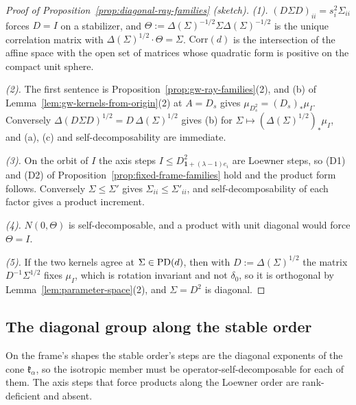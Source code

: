 \begin{proof}[Proof of Proposition~\ref{prop:diagonal-ray-families} (sketch)]
\emph{(1).} $(D\Sigma D)_{ii} = s_i^2\Sigma_{ii}$ forces $D = I$ on a stabilizer, and
$\Theta := \Delta(\Sigma)^{-1/2}\Sigma\Delta(\Sigma)^{-1/2}$ is the unique correlation matrix with
$\Delta(\Sigma)^{1/2}\cdot \Theta = \Sigma$. $\mathrm{Corr}(d)$ is the intersection of the affine space with the
open set of matrices whose quadratic form is positive on the compact unit sphere.

\emph{(2).} The first sentence is Proposition~\ref{prop:gw-ray-families}(2), and (b) of
Lemma~\ref{lem:gw-kernels-from-origin}(2) at $A = D_s$ gives $\mu_{D_s^2} = (D_s)_*\mu_I$. Conversely
$\Delta(D\Sigma D)^{1/2} = D\,\Delta(\Sigma)^{1/2}$ gives (b) for $\Sigma \mapsto (\Delta(\Sigma)^{1/2})_*\mu_I$,
and (a), (c) and self-decomposability are immediate.

\emph{(3).} On the orbit of $I$ the axis steps $I \le D^2_{\mathbf 1 + (\lambda-1)e_i}$ are Loewner steps,
so (D1) and (D2) of Proposition~\ref{prop:fixed-frame-families} hold and the product form follows.
Conversely $\Sigma \le \Sigma'$ gives $\Sigma_{ii} \le \Sigma'_{ii}$, and self-decomposability of each
factor gives a product increment.

\emph{(4).} $N(0,\Theta)$ is self-decomposable, and a product with unit diagonal would force $\Theta = I$.

\emph{(5).} If the two kernels agree at $\Sigma \in \mathrm{PD}(d)$, then with $D := \Delta(\Sigma)^{1/2}$ the
matrix $D^{-1}\Sigma^{1/2}$ fixes $\mu_I$, which is rotation invariant and not $\delta_0$, so it is
orthogonal by Lemma~\ref{lem:parameter-space}(2), and $\Sigma = D^2$ is diagonal.
\end{proof}

\subsection{The diagonal group along the stable order}

On the frame's shapes the stable order's steps are the diagonal exponents of the cone $\mathfrak k_\alpha$, so the
isotropic member must be operator-self-decomposable for each of them. The axis steps that force products
along the Loewner order are rank-deficient and absent.

